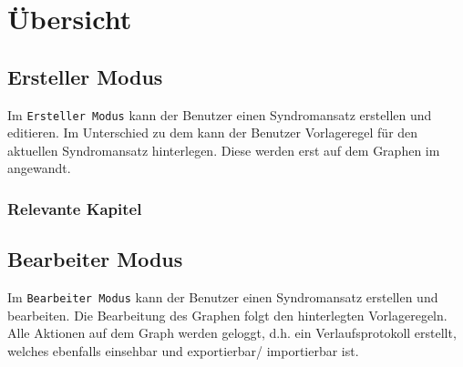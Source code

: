 \documentclass[enabledeprecatedfontcommands,fontsize=11pt,paper=a4,twoside]{scrartcl}
\newcounter{one}
\newcounter{two}[one]
\let\tempone\itemize
\let\temptwo\enditemize
\renewenvironment{itemize}{\tempone\addtolength{\itemsep}{-10.0pt}}{\temptwo}
\begin{document}
\clearpage	
\section{Übersicht} \label{sec:uebersicht}
\subsection{Ersteller Modus}
Im \texttt{Ersteller Modus} kann der Benutzer einen Syndromansatz erstellen und editieren. Im Unterschied zu dem  kann der Benutzer Vorlageregel für den aktuellen Syndromansatz hinterlegen. Diese werden erst auf dem Graphen im  angewandt. 


\subsubsection{Relevante Kapitel}
\begin{itemize}
	\item {}
	\item {}
	\item {}	
	\item {}	
	\item {}	
	\item {}
	\item {}
	\item {}
	\item {}
	\item {}
	\item {}
	\item {}
	\item {}
	\item {}	
\end{itemize}
\subsection{Bearbeiter Modus} \label{sec:editor}
Im \texttt{Bearbeiter Modus} kann der Benutzer einen Syndromansatz erstellen und bearbeiten. Die Bearbeitung des Graphen folgt den hinterlegten Vorlageregeln. Alle Aktionen auf dem Graph werden geloggt, d.h. ein Verlaufsprotokoll erstellt, welches ebenfalls einsehbar und exportierbar/ importierbar ist. 
\end{document}
